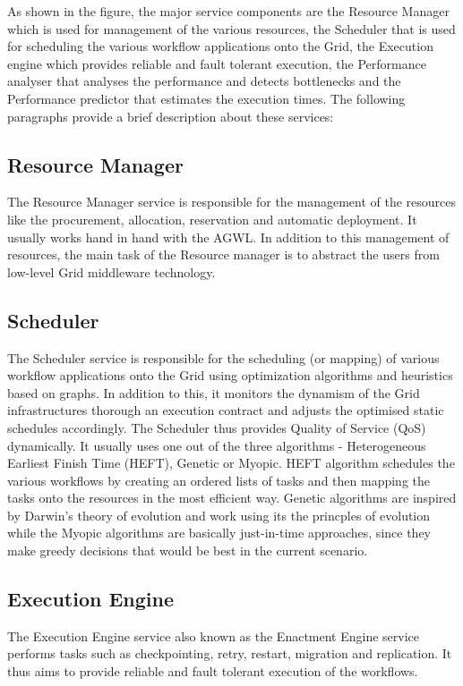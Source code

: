 \documentclass[9pt,twocolumn,twoside]{../../styles/osajnl}
\begin{document}
As shown in the figure, the major service components are the
Resource Manager which is used for management of the various
resources, the Scheduler that is used for scheduling the various
workflow applications onto the Grid, the Execution engine which
provides reliable and fault tolerant execution, the Performance
  analyser that analyses the performance and detects bottlenecks and
the Performance predictor that estimates the execution times.
The following paragraphs provide a brief description about these
services:

\subsection{Resource Manager}
The Resource Manager service is responsible for the management of
the resources like the procurement, allocation, reservation and
automatic deployment.  It usually works hand in hand with the AGWL.
In addition to this management of resources, the main task of the
Resource manager is to abstract the users from low-level Grid
middleware technology.

\subsection{Scheduler}
The Scheduler service is responsible for the scheduling (or
mapping) of various workflow applications onto the Grid using
optimization algorithms and heuristics based on graphs.  In addition
to this, it monitors the dynamism of the Grid infrastructures thorough
an execution contract and adjusts the optimised static schedules
accordingly.  The Scheduler thus provides Quality of Service (QoS)
dynamically.  It usually uses one out of the three algorithms -
Heterogeneous Earliest Finish Time (HEFT), Genetic or Myopic.  HEFT
algorithm schedules the various workflows by creating an ordered lists
of tasks and then mapping the tasks onto the resources in the most
efficient way.  Genetic algorithms are inspired by Darwin's theory of
evolution and work using its the princples of evolution while the
Myopic algorithms are basically just-in-time approaches, since they
make greedy decisions that would be best in the current scenario.

\subsection{Execution Engine}
The Execution Engine service also known as the Enactment
  Engine service performs tasks such as checkpointing, retry,
restart, migration and replication.  It thus aims to provide reliable
and fault tolerant execution of the workflows.
\end{document}
